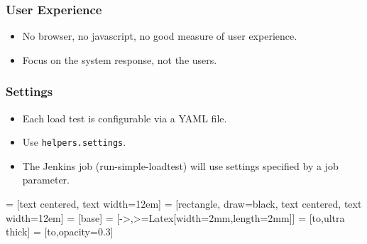 \documentclass{beamer}
\begin{document}
\begin{frame}
\frametitle{User Experience}
\begin{itemize}
\item No browser, no javascript, no good measure of user experience.
\item Focus on the system response, not the users.
\end{itemize}
\end{frame}


\begin{frame}
\frametitle{Settings}
\begin{itemize}
\item Each load test is configurable via a YAML file.\pause
\item Use \texttt{helpers.settings}.\pause
\item The Jenkins job (run-simple-loadtest) will use settings specified by a
      job parameter.
\end{itemize}
\end{frame}


 = [text centered, text width=12em]
 = [rectangle, draw=black, text centered, text width=12em]
 = [base]
 = [->,>={Latex[width=2mm,length=2mm]}]
 = [to,ultra thick]
 = [to,opacity=0.3]
\end{document}
